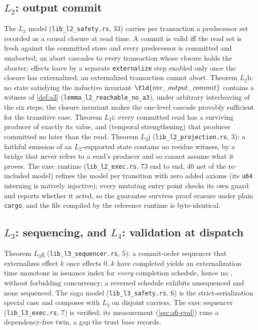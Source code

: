 \subsection{$L_2$: output commit}
\label{sec:l2}
The $L_2$ model (\texttt{lib\_l2\_safety.rs}, $33$) carries per transaction a
predecessor set recorded as a causal closure at read time. A commit is valid
iff the read set is fresh against the committed store and every predecessor
is committed and unaborted; an abort cascades to every transaction whose
closure holds the aborter; effects leave by a separate \texttt{externalize}
step enabled only once the closure has externalized; an externalized
transaction cannot abort. Theorem $L_2$h: no state satisfying the inductive
invariant $\fld{inv\_output\_commit}$ contains a witness of \cref{def:a3}
(\texttt{lemma\_l2\_reachable\_no\_a3}), under arbitrary interleaving of the
six steps; the closure invariant makes the one-level cascade provably
sufficient for the transitive case. Theorem $L_2$i: every committed read has
a surviving producer of exactly its value, and (temporal strengthening) that
producer committed no later than the read. Theorem $L_2$j
(\texttt{lib\_l2\_projection.rs}, $3$): a faithful emission of an
$L_2$-supported state contains no residue witness, by a bridge that never
refers to a read's producer and so cannot assume what it proves. The exec
runtime (\texttt{lib\_l2\_exec.rs}, $73$ end to end, $40$ net of the
re-included model) refines the model per transition with zero added axioms
(its \texttt{u64} interning is natively injective); every mutating entry
point checks its own guard and reports whether it acted, so the guarantee
survives proof erasure under plain \texttt{cargo}, and the file compiled by
the reference runtime is byte-identical.

\subsection{$L_3$: sequencing, and $L_4$: validation at dispatch}
\label{sec:l3}\label{sec:l4}
Theorem $L_3$g (\texttt{lib\_l3\_sequencer.rs}, $5$): a commit-order
sequencer that externalizes effect $k$ once effects $0..k$ have completed
yields an externalization time monotone in issuance index for \emph{every}
completion schedule, hence no , without forbidding concurrency; a
reversed schedule exhibits  unsequenced and none sequenced. The saga
model (\texttt{lib\_l3\_safety.rs}, $6$) is the strict-serialization special
case and composes with $L_2$ on disjoint carriers. The exec sequencer
(\texttt{lib\_l3\_exec.rs}, $7$) is verified; its measurement
(\cref{sec:a6-eval}) runs a dependency-free twin, a gap the trust base
records.

